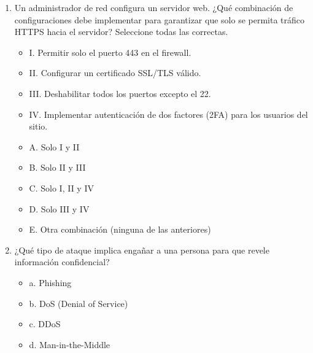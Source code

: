 \documentclass[a4paper]{article}
\begin{document}
\begin{enumerate}
    \item Un administrador de red configura un servidor web. ¿Qué combinación de configuraciones debe implementar para garantizar que solo se permita tráfico HTTPS hacia el servidor? Seleccione todas las correctas.
    \begin{itemize}
        \item I. Permitir solo el puerto 443 en el firewall.
        \item II. Configurar un certificado SSL/TLS válido.
        \item III. Deshabilitar todos los puertos excepto el 22.
        \item IV. Implementar autenticación de dos factores (2FA) para los usuarios del sitio.
    \end{itemize}
    \begin{itemize}
        \item A. Solo I y II
        \item B. Solo II y III
        \item C. Solo I, II y IV
        \item D. Solo III y IV
        \item E. Otra combinación (ninguna de las anteriores)
    \end{itemize}

    \item ¿Qué tipo de ataque implica engañar a una persona para que revele información confidencial?
    \begin{itemize}
        \item a. Phishing
        \item b. DoS (Denial of Service)
        \item c. DDoS
        \item d. Man-in-the-Middle
    \end{itemize}


\end{enumerate}
\end{document}
